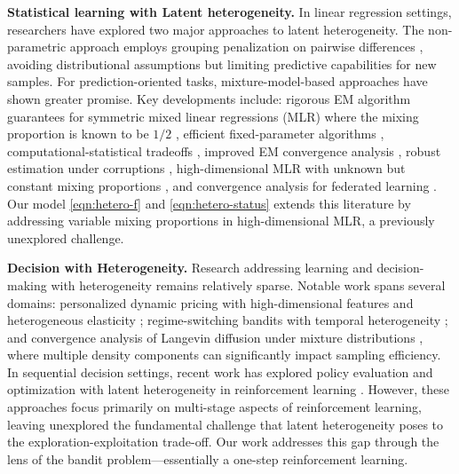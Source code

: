 \smallskip
\noindent
\textbf{Statistical learning with Latent heterogeneity.}
In linear regression settings, researchers have explored two major approaches to latent heterogeneity. The non-parametric approach employs grouping penalization on pairwise differences \citep{shen2010grouping,ke2013homogeneity,ma2017concave}, avoiding distributional assumptions but limiting predictive capabilities for new samples. For prediction-oriented tasks, mixture-model-based approaches have shown greater promise. Key developments include: rigorous EM algorithm guarantees for symmetric mixed linear regressions (MLR) where the mixing proportion is known to be $1/2$ \citep{balakrishnan2017statistical}, efficient fixed-parameter algorithms \citep{li2018learning}, computational-statistical tradeoffs \citep{fan2018curse}, improved EM convergence analysis \citep{mclachlan2019finite,klusowski2019estimating}, robust estimation under corruptions \citep{shen2019iterative}, high-dimensional MLR with unknown but constant mixing proportions \citep{zhang2020estimation}, and convergence analysis for federated learning \citep{su2024global, niu2024collaborative}. Our model \eqref{eqn:hetero-f} and \eqref{eqn:hetero-status} extends this literature by addressing variable mixing proportions in high-dimensional MLR, a previously unexplored challenge.

\smallskip
\noindent
\textbf{Decision with Heterogeneity.}
Research addressing learning and decision-making with heterogeneity remains relatively sparse. Notable work spans several domains: personalized dynamic pricing with high-dimensional features and heterogeneous elasticity \citep{ban2021personalized}; regime-switching bandits with temporal heterogeneity \citep{cao2019nearly,zhou2021regime}; and convergence analysis of Langevin diffusion under mixture distributions \citep{dong2022spectral}, where multiple density components can significantly impact sampling efficiency. In sequential decision settings, recent work has explored policy evaluation and optimization with latent heterogeneity in reinforcement learning \citep{chen2024reinforcement,bian2024off}. However, these approaches focus primarily on multi-stage aspects of reinforcement learning, leaving unexplored the fundamental challenge that latent heterogeneity poses to the exploration-exploitation trade-off. Our work addresses this gap through the lens of the bandit problem—essentially a one-step reinforcement learning.